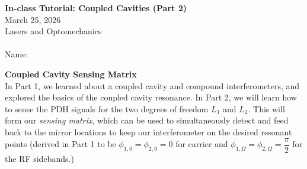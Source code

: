 \documentclass[11pt]{article}
\begin{document}
\begin{center}
    \textbf{In-class Tutorial: Coupled Cavities (Part 2)}\\
    March 25, 2026\\
    Lasers and Optomechanics\\~\\
    Name: \underline{\hspace{10cm}}
\end{center}


\noindent
\textbf{Coupled Cavity Sensing Matrix}\\
In Part 1, we learned about a coupled cavity and compound interferometers, and explored the basics of the coupled cavity resonance.
In Part 2, we will learn how to sense the PDH signals for the two degrees of freedom $L_1$ and $L_2$. 
This will form our \textit{sensing matrix}, which can be used to simultaneously detect and feed back to the mirror locations to keep our interferometer on the desired resonant points (derived in Part 1 to be $\phi_{1,0} = \phi_{2,0} = 0$ for carrier and $\phi_{1,\Omega} = \phi_{2,\Omega} = \dfrac{\pi}{2}$ for the RF sidebands.)
\end{document}

